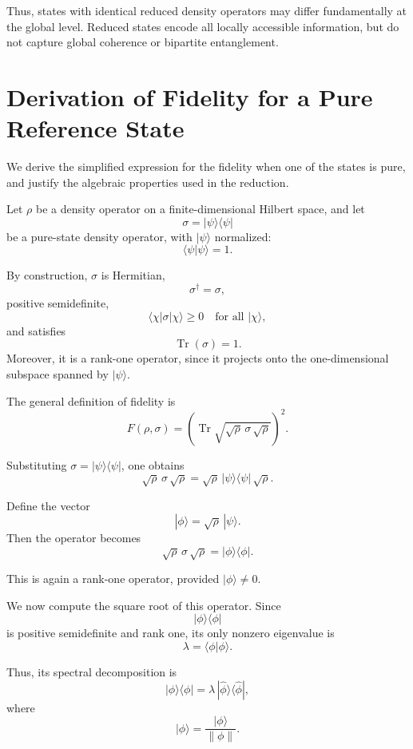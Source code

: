 \documentclass[a4paper]{article}
\begin{document}
Thus, states with identical reduced density operators may differ fundamentally at the global level. Reduced states encode all locally accessible information, but do not capture global coherence or bipartite entanglement.
\section{Derivation of Fidelity for a Pure Reference State}

We derive the simplified expression for the fidelity when one of the states is pure, and justify the algebraic properties used in the reduction.

\medskip

Let $\rho$ be a density operator on a finite-dimensional Hilbert space, and let
\[
\sigma = |\psi\rangle\langle\psi|
\]
be a pure-state density operator, with $|\psi\rangle$ normalized:
\[
\langle \psi | \psi \rangle = 1.
\]

By construction, $\sigma$ is Hermitian,
\[
\sigma^\dagger = \sigma,
\]
positive semidefinite,
\[
\langle \chi | \sigma | \chi \rangle \ge 0
\quad \text{for all } |\chi\rangle,
\]
and satisfies
\[
\operatorname{Tr}(\sigma) = 1.
\]
Moreover, it is a rank-one operator, since it projects onto the one-dimensional subspace spanned by $|\psi\rangle$.

\medskip

The general definition of fidelity is
\[
F(\rho,\sigma)
=
\left(\operatorname{Tr}\sqrt{\sqrt{\rho}\,\sigma\,\sqrt{\rho}}\right)^2.
\]

Substituting $\sigma = |\psi\rangle\langle\psi|$, one obtains
\[
\sqrt{\rho}\,\sigma\,\sqrt{\rho}
=
\sqrt{\rho}\,|\psi\rangle\langle\psi|\,\sqrt{\rho}.
\]

Define the vector
\[
|\phi\rangle = \sqrt{\rho}\,|\psi\rangle.
\]
Then the operator becomes
\[
\sqrt{\rho}\,\sigma\,\sqrt{\rho}
=
|\phi\rangle\langle\phi|.
\]

This is again a rank-one operator, provided $|\phi\rangle \neq 0$.

\medskip

We now compute the square root of this operator. Since
\[
|\phi\rangle\langle\phi|
\]
is positive semidefinite and rank one, its only nonzero eigenvalue is
\[
\lambda = \langle \phi | \phi \rangle.
\]

Thus, its spectral decomposition is
\[
|\phi\rangle\langle\phi|
=
\lambda\,|\hat{\phi}\rangle\langle\hat{\phi}|,
\]
where
\[
|\hat{\phi}\rangle = \frac{|\phi\rangle}{\|\phi\|}.
\]
\end{document}

